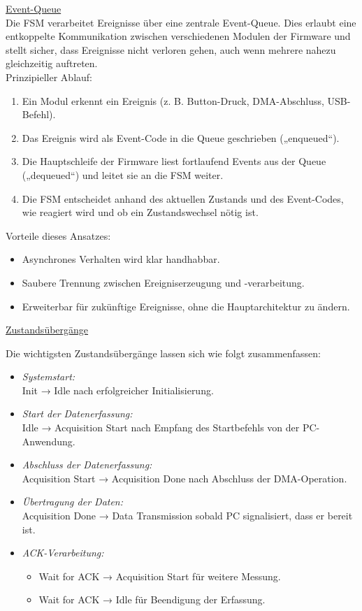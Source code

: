 \documentclass[a4paper, portrait, 12pt]{scrartcl} %
\begin{document}
\underline{Event-Queue}\\
Die FSM verarbeitet Ereignisse über eine zentrale Event-Queue.
Dies erlaubt eine entkoppelte Kommunikation zwischen verschiedenen Modulen der Firmware und stellt sicher, dass Ereignisse nicht verloren gehen, auch wenn mehrere nahezu gleichzeitig auftreten.\\

Prinzipieller Ablauf:

\begin{enumerate}
	\item Ein Modul erkennt ein Ereignis (z. B. Button-Druck, DMA-Abschluss, USB-Befehl).
	\item Das Ereignis wird als Event-Code in die Queue geschrieben („enqueued“).
	\item Die Hauptschleife der Firmware liest fortlaufend Events aus der Queue („dequeued“) und leitet sie an die FSM weiter.
	\item Die FSM entscheidet anhand des aktuellen Zustands und des Event-Codes, wie reagiert wird und ob ein Zustandswechsel nötig ist.
\end{enumerate}

Vorteile dieses Ansatzes:

\begin{itemize}
	\item Asynchrones Verhalten wird klar handhabbar.
	\item Saubere Trennung zwischen Ereigniserzeugung und -verarbeitung.
	\item Erweiterbar für zukünftige Ereignisse, ohne die Hauptarchitektur zu ändern.
\end{itemize}

\underline{Zustandsübergänge}

Die wichtigsten Zustandsübergänge lassen sich wie folgt zusammenfassen:
\begin{itemize}
	\item \emph{Systemstart:}\\
	Init → Idle nach erfolgreicher Initialisierung.
	\item \emph{Start der Datenerfassung:}\\
	Idle → Acquisition Start nach Empfang des Startbefehls von der PC-Anwendung.
	\item \emph{Abschluss der Datenerfassung:}\\
	Acquisition Start → Acquisition Done nach Abschluss der DMA-Operation.
	\item \emph{Übertragung der Daten:}\\
	Acquisition Done → Data Transmission sobald PC signalisiert, dass er bereit ist.
	\item \emph{ACK-Verarbeitung:}
	\begin{itemize}
	\item Wait for ACK → Acquisition Start für weitere Messung.
	\item Wait for ACK → Idle für Beendigung der Erfassung.
	\end{itemize}
\end{itemize}
\pagebreak
\end{document}
